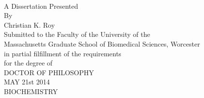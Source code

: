 \begin{titlepage}
\begin{center}
	\huge \ttitle \\[2cm] 
	{\large 
		A Dissertation Presented \\[1cm]
		By \\[1cm]
		Christian K. Roy \\[1cm]
		Submitted to the Faculty of the University of the \\
		Massachusetts Graduate School of Biomedical Sciences, Worcester\\
		in partial filfillment of the requirements\\
		for the degree of \\[2cm]
		DOCTOR OF PHILOSOPHY \\[1cm]
		MAY 21st 2014\\[1cm]
		BIOCHEMISTRY\\[1cm]
 	}
 \end{center}
 \end{titlepage}
